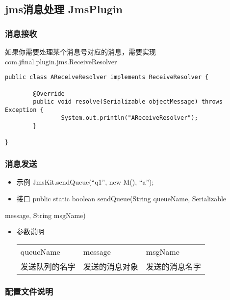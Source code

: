 \documentclass{scrartcl}
\begin{document}
\subsection{jms消息处理 JmsPlugin}
\label{sec-2-3}
\subsubsection{消息接收}
\label{sec-2-3-1}

如果你需要处理某个消息号对应的消息，需要实现com.jfinal.plugin.jms.ReceiveResolver

\begin{verbatim}
public class AReceiveResolver implements ReceiveResolver {

        @Override
        public void resolve(Serializable objectMessage) throws Exception {
                System.out.println("AReceiveResolver");
        }

}
\end{verbatim}
\subsubsection{消息发送}
\label{sec-2-3-2}

\begin{itemize}
\item 示例 JmsKit.sendQueue(``q1'', new M(), ``a'');
\item 接口 public static boolean sendQueue(String queueName, Serializable
\end{itemize}
 message, String msgName)
 
\begin{itemize}
\item 参数说明

\begin{tabular}{lll}
 queueName       &  message         &  msgName         \\
 发送队列的名字  &  发送的消息对象  &  发送的消息名字  \\
\end{tabular}


\end{itemize}
\subsubsection{配置文件说明}
\label{sec-2-3-3}
\end{document}
